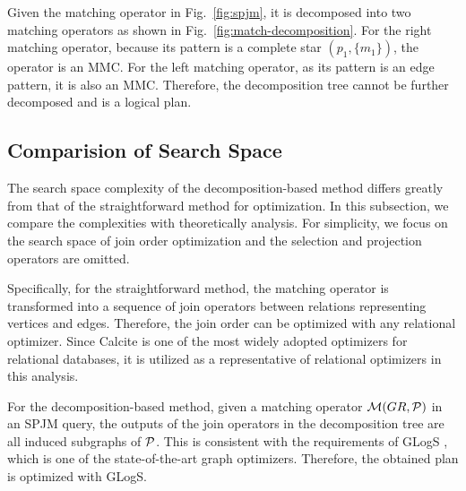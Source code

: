 \begin{example}
    Given the matching operator in Fig.~\ref{fig:spjm}, it is decomposed into two matching operators as shown in Fig.~\ref{fig:match-decomposition}.
    For the right matching operator, because its pattern is a complete star $(p_1, \{m_1\})$, the operator is an MMC.
    For the left matching operator, as its pattern is an edge pattern, it is also an MMC.
    Therefore, the decomposition tree cannot be further decomposed and is a logical plan.
\end{example}

\subsection{Comparision of Search Space}
\label{sec:compare-search-space}

The search space complexity of the decomposition-based method differs greatly from that of the straightforward method for optimization.
In this subsection, we compare the complexities with theoretically analysis.
For simplicity, we focus on the search space of join order optimization and the selection and projection operators are omitted.

Specifically, for the straightforward method, the matching operator is transformed into a sequence of join operators between relations representing vertices and edges.
Therefore, the join order can be optimized with any relational optimizer.
Since Calcite \cite{calcite,columbia} is one of the most widely adopted optimizers for relational databases, it is utilized as a representative of relational optimizers in this analysis.

For the decomposition-based method, given a matching operator $\mathcal{M}(GR, \mathcal{P})$ in an SPJM query, the outputs of the join operators in the decomposition tree are all induced subgraphs of $\mathcal{P}$.
This is consistent with the requirements of GLogS \cite{GLogS}, which is one of the state-of-the-art graph optimizers.
Therefore, the obtained plan is optimized with GLogS.

